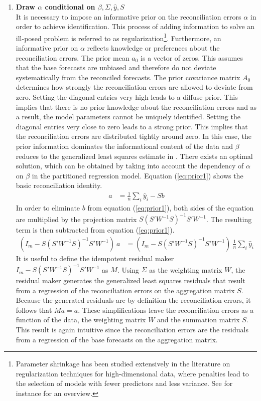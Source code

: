 \documentclass[a4paper,fleqn,11pt]{article}
\begin{document}
\begin{enumerate}
\item \textbf{Draw $\alpha$ conditional on $\beta,\Sigma,\hat{y},S$}\\
It is necessary to impose an informative prior on the reconciliation errors $\alpha$ in order to achieve identification. This process of adding information to solve an ill-posed problem is referred to as regularization\footnote{Parameter shrinkage  has been studied extensively in the literature on regularization techniques for high-dimensional data, where penalties lead to the selection of models with fewer predictors and less variance. See for instance \cite{Polson2010} for an overview.}. Furthermore, an informative prior on $\alpha$ reflects knowledge or preferences about the reconciliation errors. The prior mean $a_0$ is a vector of zeros. This assumes that the base forecasts are unbiased and therefore do not deviate systematically from the reconciled forecasts. The prior covariance matrix $A_0$ determines how strongly the reconciliation errors are allowed to deviate from zero. Setting the diagonal entries very high leads to a diffuse prior. This implies that there is no prior knowledge about the reconciliation errors and as a result, the model parameters cannot be uniquely identified. Setting the diagonal entries very close to zero leads to a strong prior. This implies that the reconciliation errors are distributed tightly around zero. In this case, the prior information dominates the informational content of the data and $\beta$ reduces to the generalized least squares estimate in \cite{Hyndman2016}. There exists an optimal solution, which can be obtained by taking into account the dependency of $\alpha$ on $\beta$ in the partitioned regression model. Equation (\ref{eq:prior1}) shows the basic reconciliation identity.
\begin{align}
	\label{eq:prior1}
	a &= \frac{1}{n}\sum_i \hat{y}_i - Sb
\end{align}
In order to eliminate $b$ from equation (\ref{eq:prior1}), both sides of the equation are multiplied by the projection matrix $S(S'W^{-1}S)^{-1}S'W^{-1}$. The resulting term is then subtracted from equation (\ref{eq:prior1}).
\begin{align}
	\label{eq:prior2}
	(I_m - S(S'W^{-1}S)^{-1}S'W^{-1})\ a &= (I_m - S(S'W^{-1}S)^{-1}S'W^{-1})\ \frac{1}{n}\sum_i \hat{y}_i  
\end{align}
It is useful to define the idempotent residual maker $I_m - S(S'W^{-1}S)^{-1}S'W^{-1}$ as $M$. Using $\Sigma$ as the weighting matrix $W$, the residual maker generates the generalized least squares residuals that result from a regression of the reconciliation errors on the aggregation matrix $S$. Because the generated residuals are by definition the reconciliation errors, it follows that $Ma = a$. These simplifications leave the reconciliation errors as a function of the data, the weighting matrix $W$ and the summation matrix $S$. This result is again intuitive since the reconciliation errors are the residuals from a regression of the base forecasts on the aggregation matrix.

\end{enumerate}
\end{document}
